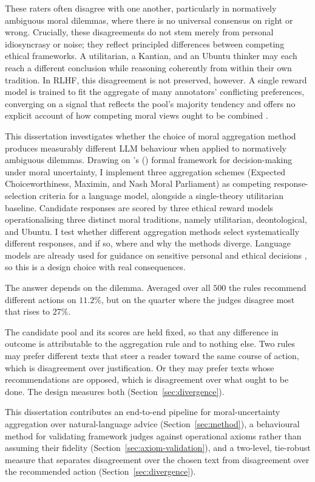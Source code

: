 \documentclass[10pt,twocolumn,a4paper]{article}
\let\cite\citep
\begin{document}
These raters often disagree with one another, particularly in normatively
ambiguous moral dilemmas, where there is no universal consensus on right or
wrong. Crucially, these disagreements do not stem merely from personal
idiosyncrasy or noise; they reflect principled differences between
competing ethical frameworks. A utilitarian, a Kantian, and an Ubuntu
thinker may each reach a different conclusion while reasoning coherently
from within their own tradition. In RLHF, this disagreement is not
preserved, however. A single reward model is trained to fit the aggregate
of many annotators' conflicting preferences, converging on a signal that
reflects the pool's majority tendency and offers no explicit account of how
competing moral views ought to be combined \cite{casper2023}.

This dissertation investigates whether the choice of moral
aggregation method produces measurably different LLM behaviour when applied
to normatively ambiguous dilemmas. Drawing on \citeauthor{macaskill2020}'s
(\citeyear{macaskill2020}) formal framework for decision-making under
moral uncertainty, I implement three aggregation schemes (Expected
Choiceworthiness, Maximin, and Nash Moral Parliament) as competing
response-selection criteria for a language model, alongside a single-theory
utilitarian baseline. Candidate responses are scored by three ethical
reward models operationalising three distinct moral traditions, namely
utilitarian, deontological, and Ubuntu. I test whether different
aggregation methods select systematically different responses, and if so,
where and why the methods diverge. Language models are already used for
guidance on sensitive personal and ethical decisions
\cite{dailydilemmas2024}, so this is a design choice with real
consequences.

The answer depends on the dilemma. Averaged over all $500$ the rules
recommend different actions on $11.2\%$, but on the quarter where the
judges disagree most that rises to $27\%$.

The candidate pool and its scores are held
fixed, so that any difference in outcome is attributable to the
aggregation rule and to nothing else. Two rules
may prefer different texts that steer a reader toward the same course of
action, which is disagreement over justification. Or they may prefer
texts whose recommendations are opposed, which is disagreement over what
ought to be done. The design measures both
(Section~\ref{sec:divergence}).

This dissertation contributes an end-to-end pipeline for
moral-uncertainty aggregation over natural-language advice
(Section~\ref{sec:method}), a behavioural method for validating
framework judges against operational axioms rather than assuming their
fidelity (Section~\ref{sec:axiom-validation}), and a two-level,
tie-robust measure that separates disagreement over the chosen text
from disagreement over the recommended action
(Section~\ref{sec:divergence}).
\end{document}

